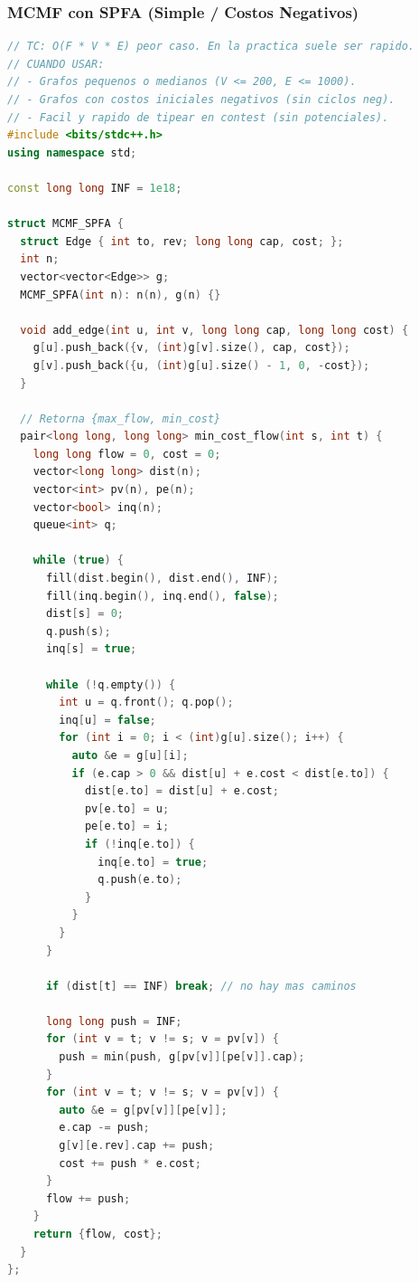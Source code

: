 \subsubsection{MCMF con SPFA (Simple / Costos Negativos)}
\begin{lstlisting}[style=mystyle, language=C++]
// TC: O(F * V * E) peor caso. En la practica suele ser rapido.
// CUANDO USAR:
// - Grafos pequenos o medianos (V <= 200, E <= 1000).
// - Grafos con costos iniciales negativos (sin ciclos neg).
// - Facil y rapido de tipear en contest (sin potenciales).
#include <bits/stdc++.h>
using namespace std;

const long long INF = 1e18;

struct MCMF_SPFA {
  struct Edge { int to, rev; long long cap, cost; };
  int n;
  vector<vector<Edge>> g;
  MCMF_SPFA(int n): n(n), g(n) {}

  void add_edge(int u, int v, long long cap, long long cost) {
    g[u].push_back({v, (int)g[v].size(), cap, cost});
    g[v].push_back({u, (int)g[u].size() - 1, 0, -cost});
  }

  // Retorna {max_flow, min_cost}
  pair<long long, long long> min_cost_flow(int s, int t) {
    long long flow = 0, cost = 0;
    vector<long long> dist(n);
    vector<int> pv(n), pe(n);
    vector<bool> inq(n);
    queue<int> q;

    while (true) {
      fill(dist.begin(), dist.end(), INF);
      fill(inq.begin(), inq.end(), false);
      dist[s] = 0;
      q.push(s);
      inq[s] = true;

      while (!q.empty()) {
        int u = q.front(); q.pop();
        inq[u] = false;
        for (int i = 0; i < (int)g[u].size(); i++) {
          auto &e = g[u][i];
          if (e.cap > 0 && dist[u] + e.cost < dist[e.to]) {
            dist[e.to] = dist[u] + e.cost;
            pv[e.to] = u;
            pe[e.to] = i;
            if (!inq[e.to]) {
              inq[e.to] = true;
              q.push(e.to);
            }
          }
        }
      }

      if (dist[t] == INF) break; // no hay mas caminos

      long long push = INF;
      for (int v = t; v != s; v = pv[v]) {
        push = min(push, g[pv[v]][pe[v]].cap);
      }
      for (int v = t; v != s; v = pv[v]) {
        auto &e = g[pv[v]][pe[v]];
        e.cap -= push;
        g[v][e.rev].cap += push;
        cost += push * e.cost;
      }
      flow += push;
    }
    return {flow, cost};
  }
};
\end{lstlisting}

